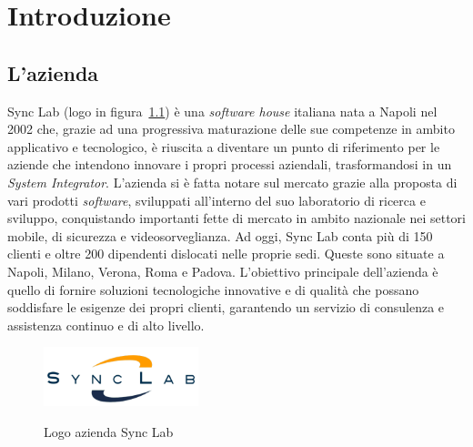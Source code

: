 \chapter{Introduzione}\label{cap:introduzione}


\section{L'azienda}\label{sec:azienda}

Sync Lab (logo in figura~\ref{fig:logo-synclab}) è una \textit{software house} italiana 
nata a Napoli nel 2002 che, grazie ad una progressiva
maturazione delle sue competenze in ambito applicativo e tecnologico, è riuscita a diventare un
punto di riferimento per le aziende che intendono innovare i propri processi aziendali,
trasformandosi in un \textit{System Integrator}. L'azienda si è fatta notare sul mercato grazie alla proposta
di vari prodotti \textit{software}, sviluppati all'interno del suo laboratorio di ricerca e sviluppo, 
conquistando importanti fette di mercato in ambito nazionale nei settori mobile, di sicurezza e videosorveglianza.
Ad oggi, Sync Lab conta più di 150 clienti e oltre 200 dipendenti dislocati nelle proprie sedi.
Queste sono situate a Napoli, Milano, Verona, Roma e Padova.
L'obiettivo principale dell'azienda è quello di fornire soluzioni tecnologiche innovative e di qualità
che possano soddisfare le esigenze dei propri clienti, garantendo un servizio di consulenza
e assistenza continuo e di alto livello.\\

\begin{figure}[ht]
    \centering
    \includegraphics[width=0.4\textwidth, alt={Logo dell'azienda Sync Lab}]{immagini/synclab.png}
    \caption{Logo azienda Sync Lab}\label{fig:logo-synclab}
\end{figure}

\newpage

